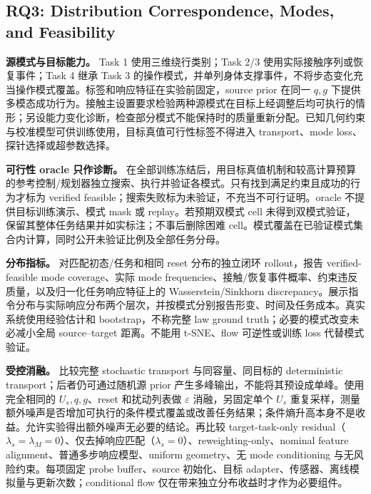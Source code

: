 \documentclass[11pt]{article}
\begin{document}
\subsection{RQ3: Distribution Correspondence, Modes, and Feasibility}


\textbf{源模式与目标能力。} Task 1 使用三维绕行类别；Task 2/3 使用实际接触序列或恢复事件；Task 4 继承 Task 3 的操作模式，并单列身体支撑事件，不将步态变化充当操作模式覆盖。标签和响应特征在实验前固定，source prior 在同一 $q,g$ 下提供多模态成功行为。接触主设置要求检验两种源模式在目标上经调整后均可执行的情形；另设能力变化诊断，检查部分模式不能保持时的质量重新分配。已知几何约束与校准模型可供训练使用，目标真值可行性标签不得进入 transport、mode loss、探针选择或超参数选择。

\textbf{可行性 oracle 只作诊断。} 在全部训练冻结后，用目标真值机制和较高计算预算的参考控制/规划器独立搜索、执行并验证各模式。只有找到满足约束且成功的行为才标为 verified feasible；搜索失败标为未验证，不充当不可行证明。oracle 不提供目标训练演示、模式 mask 或 replay。若预期双模式 cell 未得到双模式验证，保留其整体任务结果并如实标注；不事后删除困难 cell。模式覆盖在已验证模式集合内计算，同时公开未验证比例及全部任务分母。

\textbf{分布指标。} 对匹配初态/任务和相同 reset 分布的独立闭环 rollout，报告 verified-feasible mode coverage、实际 mode frequencies、接触/恢复事件概率、约束违反质量，以及归一化任务响应特征上的 Wasserstein/Sinkhorn discrepancy。展示指令分布与实际响应分布两个层次，并按模式分别报告形变、时间及任务成本。真实系统使用经验估计和 bootstrap，不称完整 law ground truth；必要的模式改变未必减小全局 source--target 距离。不能用 t-SNE、flow 可逆性或训练 loss 代替模式验证。

\textbf{受控消融。} 比较完整 stochastic transport 与同容量、同目标的 deterministic transport；后者仍可通过随机源 prior 产生多峰输出，不能将其预设成单峰。使用完全相同的 $U_s,q,g$、reset 和扰动列表做 $\varepsilon$ 消融，另固定单个 $U_s$ 重复采样，测量额外噪声是否增加可执行的条件模式覆盖或改善任务结果；条件熵升高本身不是收益。允许实验得出额外噪声无必要的结论。再比较 target-task-only residual（$\lambda_s=\lambda_M=0$）、仅去掉响应匹配（$\lambda_s=0$）、reweighting-only、nominal feature alignment、普通多步响应模型、uniform geometry、无 mode conditioning 与无风险约束。每项固定 probe buffer、source 初始化、目标 adapter、传感器、离线模拟量与更新次数；conditional flow 仅在带来独立分布收益时才作为必要组件。


\end{document}
